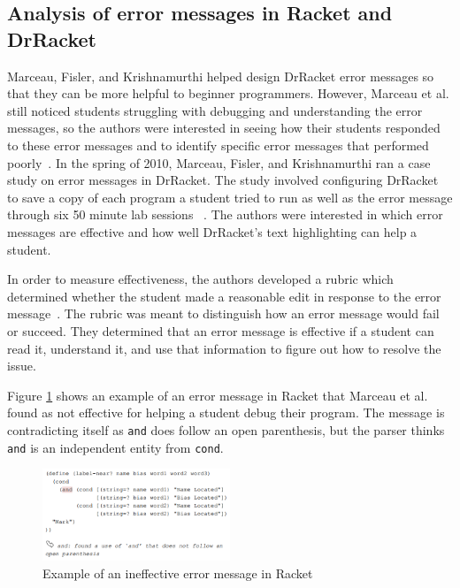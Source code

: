 \documentclass{sig-alternate}
\begin{document}
\subsection{Analysis of error messages in Racket and DrRacket}\label{racket analysis}
Marceau, Fisler, and Krishnamurthi helped design DrRacket error messages so that they can be more helpful to beginner programmers.
However, Marceau et al. still noticed students struggling with debugging and understanding the error messages, so the authors were interested in seeing how their students responded to these error messages and to identify specific error messages that performed poorly~\cite{Marceau:2011:MYL:2048237.2048241}.
In the spring of 2010, Marceau, Fisler, and Krishnamurthi ran a case study on error messages in DrRacket.
The study involved configuring DrRacket to save a copy of each program a student tried to run as well as the error message through six 50 minute lab sessions ~\cite{Marceau:2011:MEE:1953163.1953308}.
The authors were interested in which error messages are effective and how well DrRacket's text highlighting can help a student.  

In order to measure effectiveness, the authors developed a rubric which determined whether the student made a reasonable edit in response to the error message~\cite{Marceau:2011:MEE:1953163.1953308}.
The rubric was meant to distinguish how an error message would fail or succeed.
They determined that an error message is effective if a student can read it, understand it, and use that information to figure out how to resolve the issue.

Figure \ref{fig:racketerrormessage} shows an example of an error message in Racket that Marceau et al. found as not effective for helping a student debug their program.
The message is contradicting itself as \texttt{and} does follow an open parenthesis, but the parser thinks \texttt{and} is an independent entity from \texttt{cond}.

\begin{figure}[t!]
  \centering
  \includegraphics[keepaspectratio, width=0.5\textwidth]{MEE_example.png}
  \caption{Example of an ineffective error message in Racket}
  \label{fig:racketerrormessage}
\end{figure}
\end{document}
